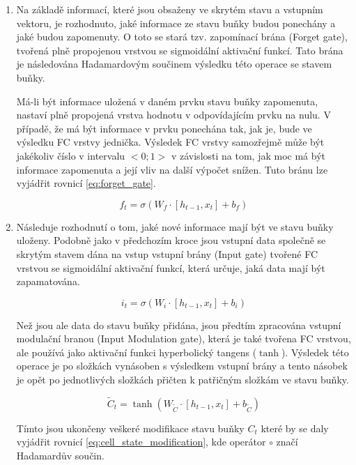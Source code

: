 \begin{enumerate}

\item Na základě informací, které jsou obsaženy ve skrytém stavu a vstupním vektoru, je rozhodnuto, jaké informace ze stavu buňky budou ponechány a jaké budou zapomenuty.
O toto se stará tzv. zapomínací brána (Forget gate), tvořená plně propojenou vrstvou se sigmoidální aktivační funkcí.
Tato brána je následována Hadamardovým součinem výsledku této operace se stavem buňky.

Má-li být informace uložená v daném prvku stavu buňky zapomenuta, nastaví plně propojená vrstva hodnotu v odpovídajícím prvku na nulu.
V případě, že má být informace v prvku ponechána tak, jak je, bude ve výsledku FC vrstvy jednička.
Výsledek FC vrstvy samozřejmě může být jakékoliv číslo v intervalu \(<0;1>\) v závislosti na tom, jak moc má být informace zapomenuta a její vliv na další výpočet snížen.
Tuto bránu lze vyjádřit rovnicí \ref{eq:forget_gate}. 

\begin{equation}
f_t = \sigma(W_f \cdot [h_{t-1}, x_t] + b_f)
\label{eq:forget_gate}
\end{equation}


\item Následuje rozhodnutí o tom, jaké nové informace mají být ve stavu buňky uloženy.
Podobně jako v předchozím kroce jsou vstupní data společně se skrytým stavem dána na vstup vstupní brány (Input gate) tvořené FC vrstvou se sigmoidální aktivační funkcí, která určuje, jaká data mají být zapamatována.

\begin{equation}
i_t = \sigma(W_i \cdot [h_{t-1}, x_t] + b_i)
\label{eq:input_gate}
\end{equation}

Než jsou ale data do stavu buňky přidána, jsou předtím zpracována vstupní modulační branou (Input Modulation gate), která je také tvořena FC vrstvou, ale používá jako aktivační funkci hyperbolický tangens (\(\tanh\)).
Výsledek této operace je po složkách vynásoben s výsledkem vstupní brány a tento násobek je opět po jednotlivých složkách přičten k patřičným složkám ve stavu buňky.

\begin{equation}
\widetilde{C}_t = \tanh(W_{\widetilde{C}} \cdot [h_{t-1}, x_t] + b_{\widetilde{C}})
\label{eq:input_modulation_gate}
\end{equation}

Tímto jsou ukončeny veškeré modifikace stavu buňky \(C_t\) které by se daly vyjádřit rovnicí \ref{eq:cell_state_modification}, kde operátor \(\circ\) značí Hadamardův součin.


\end{enumerate}
